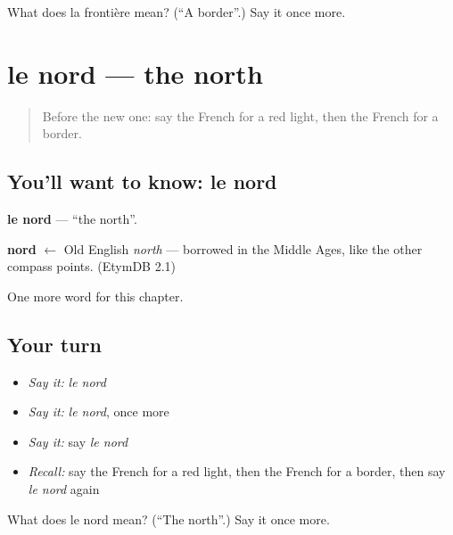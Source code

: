 \begin{tcolorbox}[breakable,colback=teal!4,colframe=teal!35!black,title={Before you move on}]
What does la frontière mean? (\textquotedblleft{}A border\textquotedblright{}.) Say it once more.
\end{tcolorbox}
\section[le nord]{le nord — the north}

\label{lesson:FR-C109-nord}



\begin{quote}
Before the new one: say the French for a red light, then the French for a border.
\end{quote}

\subsection*{You'll want to know: le nord}
\textbf{le nord} — \textquotedblleft{}the north\textquotedblright{}.

\begin{cousinweb}
\textbf{nord} $\leftarrow$ Old English \emph{north} — borrowed in the Middle Ages, like the other compass points. (EtymDB 2.1)
\end{cousinweb}

\begin{grammarlens}[title={What you've built}]
One more word for this chapter.
\end{grammarlens}

\subsection*{Your turn}
\begin{itemize}
\raggedright
  \item \emph{Say it:} \emph{le nord}
  \item \emph{Say it:} \emph{le nord}, once more
  \item \emph{Say it:} say \emph{le nord}
  \item \emph{Recall:} say the French for a red light, then the French for a border, then say \emph{le nord} again
\end{itemize}

\begin{tcolorbox}[breakable,colback=teal!4,colframe=teal!35!black,title={Before you move on}]
What does le nord mean? (\textquotedblleft{}The north\textquotedblright{}.) Say it once more.
\end{tcolorbox}
